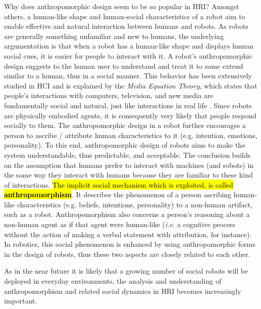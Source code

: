 \documentclass[lettersize, apacite, twoside, HRI]{apa_HRI}
\begin{document}
     Why does anthropomorphic design seem to be so popular in HRI? Amongst others, a human-like shape and human-social characteristics of a robot aim to enable effective and natural interaction between humans and robots. As robots are generally something unfamiliar and new to humans, the underlying argumentation is that when a robot has a human-like shape and displays human social cues, it is easier for people to interact with it. A robot's anthropomorphic design suggests to the human user to understand and treat it to some extend similar to a human, thus in a social manner. This behavior has been extensively studied in HCI and is explained by the \emph{Media Equation Theory}, which states that people's interactions with computers, television, and new media are fundamentally social and natural, just like interactions in real life \cite{reeves_media_1996}. Since robots are physically embodied agents, it is consequently very likely that people respond socially to them. The anthropomorphic design in a robot further encourages a person to ascribe / attribute human characteristics to it (e.g. intention, emotions, personality). To this end, anthropomorphic design of robots aims to make the system understandable, thus predictable, and acceptable. The conclusion builds on the assumption that humans prefer to interact with machines (and robots) in the same way they interact with humans \cite{fong_survey_2003} because they are familiar to these kind of interactions. \hl{The implicit social mechanism which is exploited, is called \textbf{anthropomorphism}}. It describes the phenomenon of a person ascribing human-like characteristics (e.g. beliefs, intentions, personality) to a non-human artifact, such as a robot. Anthropomorphism also concerns a person's reasoning about a non-human agent as if that agent were human-like (\textit{i.e.} a cognitive process without the action of making a verbal statement with attribution, for instance). In robotics, this social phenomenon is enhanced by using anthropomorphic forms in the design of robots, thus these two aspects are closely related to each other. 
	
	As in the near future it is likely that a growing number of social robots will be deployed in everyday environments, the analysis and understanding of anthropomorphism and related social dynamics in HRI becomes increasingly important.
	
%
%
%
%
%
%
\end{document}
